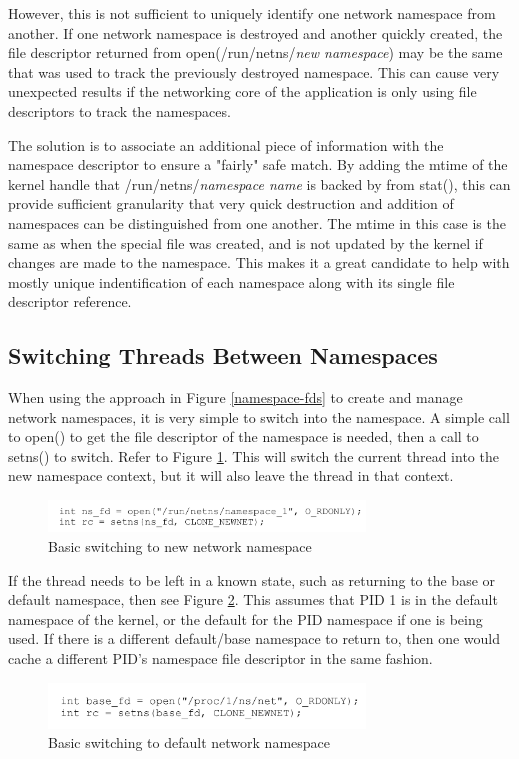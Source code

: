 \documentclass[letterpaper]{article}
\begin{document}
However, this is not sufficient to uniquely identify one network namespace from another. If one network namespace is destroyed and another quickly created, the file descriptor returned from open(/run/netns/\textit{new namespace}) may be the same that was used to track the previously destroyed namespace. This can cause very unexpected results if the networking core of the application is only using file descriptors to track the namespaces.

The solution is to associate an additional piece of information with the namespace descriptor to ensure a "fairly" safe match. By adding the mtime of the kernel handle that /run/netns/\textit{namespace name} is backed by from stat(), this can provide sufficient granularity that very quick destruction and addition of namespaces can be distinguished from one another. The mtime in this case is the same as when the special file was created, and is not updated by the kernel if changes are made to the namespace. This makes it a great candidate to help with mostly unique indentification of each namespace along with its single file descriptor reference.

\subsection{Switching Threads Between Namespaces}
When using the approach in Figure \ref{namespace-fds} to create and manage network namespaces, it is very simple to switch into the namespace. A simple call to open() to get the file descriptor of the namespace is needed, then a call to setns() to switch. Refer to Figure \ref{switch-new-namespace}. This will switch the current thread into the new namespace context, but it will also leave the thread in that context.
\begin{figure}[h]
\includegraphics[width=3.31in]{switch-new-namespace.png}
\caption{Basic switching to new network namespace}
\label{switch-new-namespace}
\end{figure}

If the thread needs to be left in a known state, such as returning to the base or default namespace, then see Figure \ref{switch-base-namespace}. This assumes that PID 1 is in the default namespace of the kernel, or the default for the PID namespace if one is being used. If there is a different default/base namespace to return to, then one would cache a different PID's namespace file descriptor in the same fashion.
\begin{figure}[h]
\includegraphics[width=3.31in]{switch-base-namespace.png}
\caption{Basic switching to default network namespace}
\label{switch-base-namespace}
\end{figure}
\end{document}
